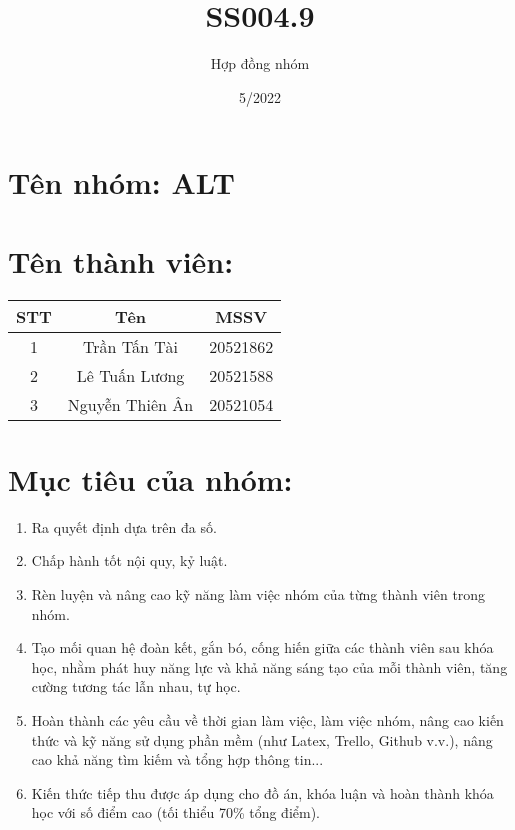 \documentclass{article}
\title{SS004.9}
\author{Hợp đồng nhóm}
\date{5/2022}
\begin{document}
\maketitle


\section{Tên nhóm: ALT}

\section{Tên thành viên:}

\begin{center}
\begin{tabular} {|c|c|c|} \hline
STT & Tên & MSSV \\\hline
1 & Trần Tấn Tài & 20521862 \\ \hline
2 &  Lê Tuấn Lương & 20521588 \\ \hline
3 &  Nguyễn Thiên Ân & 20521054 \\ \hline

\end{tabular}
\end{center}

\section{Mục tiêu của nhóm:}


\begin{enumerate}
\item Ra quyết định dựa trên đa số.
\item Chấp hành tốt nội quy, kỷ luật.
\item Rèn luyện và nâng cao kỹ năng làm việc nhóm của từng thành viên trong nhóm.
\item Tạo mối quan hệ đoàn kết, gắn bó, cống hiến giữa các thành viên sau khóa học, nhằm phát huy năng lực và khả năng sáng tạo của mỗi thành viên, tăng cường tương tác lẫn nhau, tự học.
\item Hoàn thành các yêu cầu về thời gian làm việc, làm việc nhóm, nâng cao kiến thức và kỹ năng sử dụng phần mềm (như Latex, Trello, Github v.v.), nâng cao khả năng tìm kiếm và tổng hợp thông tin...
\item Kiến thức tiếp thu được áp dụng cho đồ án, khóa luận và hoàn thành khóa học với số điểm cao (tối thiểu 70\% tổng điểm).
\end{enumerate}
\end{document}
